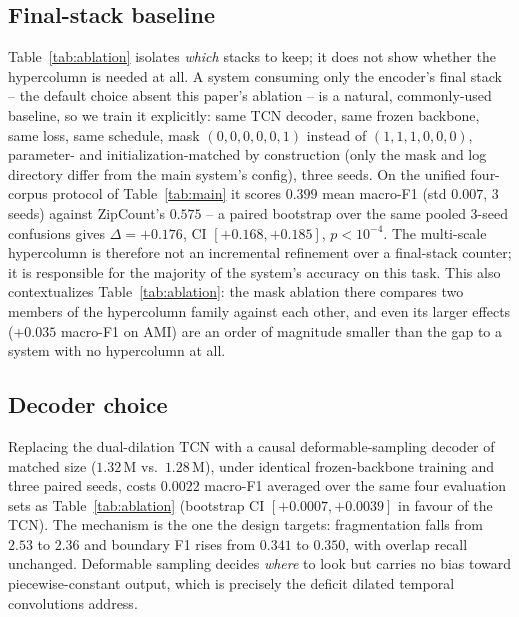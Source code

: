 \documentclass[journal]{IEEEtran}
\newcommand{\sys}{ZipCount}
\begin{document}
\subsection{Final-stack baseline}
\label{sec:final-stack}
Table~\ref{tab:ablation} isolates \emph{which} stacks to keep; it does not
show whether the hypercolumn is needed at all. A system consuming only the
encoder's final stack -- the default choice absent this paper's ablation --
is a natural, commonly-used baseline, so we train it explicitly: same TCN
decoder, same frozen backbone, same loss, same schedule, mask
$(0,0,0,0,0,1)$ instead of $(1,1,1,0,0,0)$, parameter- and
initialization-matched by construction (only the mask and log directory
differ from the main system's config), three seeds. On the unified
four-corpus protocol of Table~\ref{tab:main} it scores $0.399$ mean
macro-F1 (std $0.007$, 3 seeds) against \sys{}'s $0.575$ -- a paired
bootstrap over the same pooled 3-seed confusions gives
$\Delta=+0.176$, CI $[+0.168,+0.185]$, $p<10^{-4}$. The multi-scale
hypercolumn is therefore not an incremental refinement over a final-stack
counter; it is responsible for the majority of the system's accuracy on
this task. This also contextualizes Table~\ref{tab:ablation}: the mask
ablation there compares two members of the hypercolumn family against each
other, and even its larger effects ($+0.035$ macro-F1 on AMI) are an order
of magnitude smaller than the gap to a system with no hypercolumn at all.

\subsection{Decoder choice}
Replacing the dual-dilation TCN with a causal deformable-sampling decoder of
matched size ($1.32$\,M vs.\ $1.28$\,M), under identical frozen-backbone
training and three paired seeds, costs $0.0022$ macro-F1 averaged over the
same four evaluation sets as Table~\ref{tab:ablation} (bootstrap CI
$[+0.0007,+0.0039]$ in favour of the TCN). The mechanism is the one the
design targets: fragmentation falls from $2.53$ to $2.36$ and boundary F1
rises from $0.341$ to $0.350$, with overlap recall unchanged. Deformable
sampling decides \emph{where} to look but carries no bias toward
piecewise-constant output, which is precisely the deficit dilated temporal
convolutions address.
\end{document}
